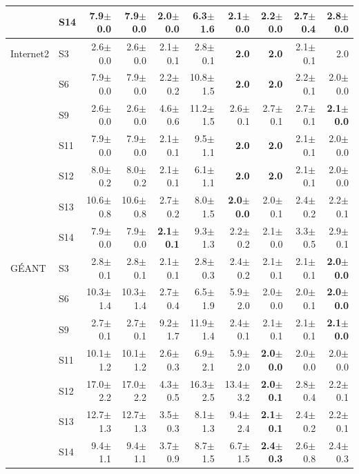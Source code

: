 \begin{table}[t]
\begin{tabular}{llrrrrrrrr}
 & S14 & 7.9$\pm$0.0 & 7.9$\pm$0.0 & \textbf{2.0$\pm$0.0} & 6.3$\pm$1.6 & 2.1$\pm$0.0 & 2.2$\pm$0.0 & 2.7$\pm$0.4 & 2.8$\pm$0.0\\
\midrule
Internet2 & S3 & 2.6$\pm$0.0 & 2.6$\pm$0.0 & 2.1$\pm$0.1 & 2.8$\pm$0.1 & \textbf{2.0} & \textbf{2.0} & 2.1$\pm$0.1 & 2.0\\
 & S6 & 7.9$\pm$0.0 & 7.9$\pm$0.0 & 2.2$\pm$0.2 & 10.8$\pm$1.5 & \textbf{2.0} & \textbf{2.0} & 2.2$\pm$0.1 & 2.0$\pm$0.0\\
 & S9 & 2.6$\pm$0.0 & 2.6$\pm$0.0 & 4.6$\pm$0.6 & 11.2$\pm$1.5 & 2.6$\pm$0.1 & 2.7$\pm$0.1 & 2.7$\pm$0.1 & \textbf{2.1$\pm$0.0}\\
 & S11 & 7.9$\pm$0.0 & 7.9$\pm$0.0 & 2.1$\pm$0.1 & 9.5$\pm$1.1 & \textbf{2.0} & \textbf{2.0} & 2.1$\pm$0.1 & 2.0$\pm$0.0\\
 & S12 & 8.0$\pm$0.2 & 8.0$\pm$0.2 & 2.1$\pm$0.1 & 6.1$\pm$1.1 & \textbf{2.0} & \textbf{2.0} & 2.1$\pm$0.1 & 2.0$\pm$0.0\\
 & S13 & 10.6$\pm$0.8 & 10.6$\pm$0.8 & 2.7$\pm$0.2 & 8.0$\pm$1.5 & \textbf{2.0$\pm$0.0} & 2.0$\pm$0.1 & 2.4$\pm$0.2 & 2.2$\pm$0.1\\
 & S14 & 7.9$\pm$0.0 & 7.9$\pm$0.0 & \textbf{2.1$\pm$0.1} & 9.3$\pm$1.3 & 2.2$\pm$0.2 & 2.1$\pm$0.0 & 3.3$\pm$0.5 & 2.9$\pm$0.1\\
\midrule
G\'EANT & S3 & 2.8$\pm$0.1 & 2.8$\pm$0.1 & 2.1$\pm$0.1 & 2.8$\pm$0.3 & 2.4$\pm$0.2 & 2.1$\pm$0.1 & 2.1$\pm$0.1 & \textbf{2.0$\pm$0.0}\\
 & S6 & 10.3$\pm$1.4 & 10.3$\pm$1.4 & 2.7$\pm$0.4 & 6.5$\pm$1.9 & 5.9$\pm$2.0 & 2.0$\pm$0.0 & 2.0$\pm$0.1 & \textbf{2.0$\pm$0.0}\\
 & S9 & 2.7$\pm$0.1 & 2.7$\pm$0.1 & 9.2$\pm$1.7 & 11.9$\pm$1.4 & 2.4$\pm$0.1 & 2.1$\pm$0.1 & 2.1$\pm$0.1 & \textbf{2.1$\pm$0.0}\\
 & S11 & 10.1$\pm$1.2 & 10.1$\pm$1.2 & 2.6$\pm$0.3 & 6.9$\pm$2.1 & 5.9$\pm$2.0 & \textbf{2.0$\pm$0.0} & 2.0$\pm$0.0 & 2.0$\pm$0.0\\
 & S12 & 17.0$\pm$2.2 & 17.0$\pm$2.2 & 4.3$\pm$0.5 & 16.3$\pm$2.5 & 13.4$\pm$3.2 & \textbf{2.0$\pm$0.1} & 2.8$\pm$0.4 & 2.2$\pm$0.1\\
 & S13 & 12.7$\pm$1.3 & 12.7$\pm$1.3 & 3.5$\pm$0.3 & 8.1$\pm$1.3 & 9.4$\pm$2.4 & \textbf{2.1$\pm$0.1} & 2.4$\pm$0.2 & 2.2$\pm$0.1\\
 & S14 & 9.4$\pm$1.1 & 9.4$\pm$1.1 & 3.7$\pm$0.9 & 8.7$\pm$1.5 & 6.7$\pm$1.5 & \textbf{2.4$\pm$0.3} & 2.6$\pm$0.8 & 2.4$\pm$0.3\\
\bottomrule
\end{tabular}
\end{table}
